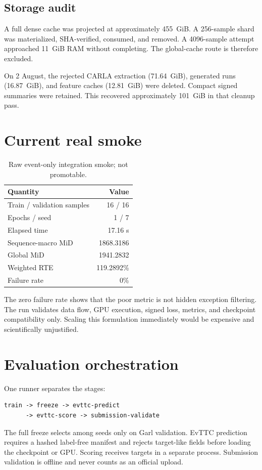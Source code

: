 \documentclass[10pt,twocolumn]{article}
\begin{document}
\subsection{Storage audit}

A full dense cache was projected at approximately 455~GiB. A 256-sample shard was
materialized, SHA-verified, consumed, and removed. A 4096-sample attempt approached
11~GiB RAM without completing. The global-cache route is therefore excluded.

On 2 August, the rejected CARLA extraction (71.64~GiB), generated runs
(16.87~GiB), and feature caches (12.81~GiB) were deleted. Compact signed summaries
were retained. This recovered approximately 101~GiB in that cleanup pass.

\section{Current real smoke}

\begin{table}[t]
\centering
\caption{Raw event-only integration smoke; not promotable.}
\label{tab:smoke}
\small
\begin{tabular}{lr}
\toprule
Quantity & Value \\
\midrule
Train / validation samples & 16 / 16 \\
Epochs / seed & 1 / 7 \\
Elapsed time & 17.16 s \\
Sequence-macro MiD & 1868.3186 \\
Global MiD & 1941.2832 \\
Weighted RTE & 119.2892\% \\
Failure rate & 0\% \\
\bottomrule
\end{tabular}
\end{table}

The zero failure rate shows that the poor metric is not hidden exception filtering.
The run validates data flow, GPU execution, signed loss, metrics, and checkpoint
compatibility only. Scaling this formulation immediately would be expensive and
scientifically unjustified.

\section{Evaluation orchestration}

One runner separates the stages:
\begin{lstlisting}
train -> freeze -> evttc-predict
      -> evttc-score -> submission-validate
\end{lstlisting}
The full freeze selects among seeds only on Garl validation. EvTTC prediction
requires a hashed label-free manifest and rejects target-like fields before loading
the checkpoint or GPU. Scoring receives targets in a separate process. Submission
validation is offline and never counts as an official upload.
\end{document}
